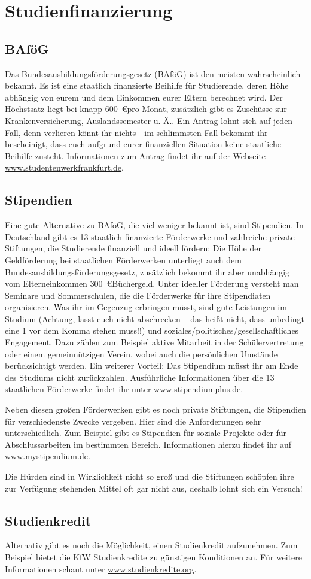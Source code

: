 \section{Studienfinanzierung}
\subsection{BAföG}
Das Bundesausbildungsförderungsgesetz (BAföG) ist den meisten wahrscheinlich bekannt. Es ist eine staatlich finanzierte Beihilfe für Studierende, deren Höhe abhängig von eurem und dem Einkommen eurer Eltern berechnet wird. Der Höchstsatz liegt bei knapp 600~\euro pro Monat, zusätzlich gibt es Zuschüsse zur Krankenversicherung, Auslandssemester u. Ä.. Ein Antrag lohnt sich auf jeden Fall, denn verlieren könnt ihr nichts - im schlimmsten Fall bekommt ihr bescheinigt,
dass euch aufgrund eurer finanziellen Situation keine staatliche Beihilfe zusteht. Informationen zum Antrag findet ihr auf der Webseite \url{www.studentenwerkfrankfurt.de}.

\subsection{Stipendien}
Eine gute Alternative zu BAföG, die viel weniger bekannt ist, sind Stipendien. In Deutschland gibt es 13 staatlich finanzierte Förderwerke und zahlreiche private Stiftungen, die Studierende finanziell und ideell fördern: Die Höhe der Geldförderung bei staatlichen Förderwerken unterliegt
auch dem Bundesausbildungsförderungsgesetz, zusätzlich bekommt ihr aber unabhängig vom Elterneinkommen 300~\euro Büchergeld. Unter ideeller Förderung versteht man Seminare und Sommerschulen, die die Förderwerke für ihre Stipendiaten organisieren. Was ihr im Gegenzug erbringen müsst, sind gute Leistungen im Studium (Achtung, lasst euch nicht abschrecken
– das heißt nicht, dass unbedingt eine 1 vor dem Komma stehen muss!!) und soziales/politisches/gesellschaftliches Engagement. Dazu zählen zum Beispiel aktive Mitarbeit in der
Schülervertretung oder einem gemeinnützigen Verein, wobei auch die persönlichen Umstände berücksichtigt werden. Ein weiterer Vorteil: Das Stipendium müsst ihr am Ende des Studiums
nicht zurückzahlen. Ausführliche Informationen über die 13 staatlichen Förderwerke findet ihr unter \url{www.stipendiumplus.de}. 

Neben diesen großen Förderwerken gibt es noch private Stiftungen, die Stipendien für verschiedenste Zwecke vergeben. Hier sind die Anforderungen
sehr unterschiedlich. Zum Beispiel gibt es Stipendien für soziale Projekte oder für Abschlussarbeiten
im bestimmten Bereich. Informationen hierzu findet ihr auf \url{www.mystipendium.de}.

Die Hürden sind in Wirklichkeit nicht so groß und die Stiftungen schöpfen ihre zur Verfügung stehenden Mittel oft gar nicht aus, deshalb lohnt sich ein Versuch!

\subsection{Studienkredit}
Alternativ gibt es noch die Möglichkeit, einen Studienkredit aufzunehmen. Zum Beispiel bietet die KfW Studienkredite zu günstigen Konditionen an. Für weitere Informationen schaut unter \url{www.studienkredite.org}.
